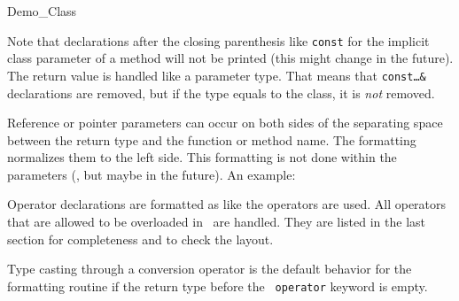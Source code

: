 \begin{class}{Demo_Class}
{Note that declarations after the closing parenthesis like {\tt const}
for the implicit class parameter of a method will not be printed
(this might change in the future).
The return value is handled like a parameter type. That means that
{\tt const\ldots\&} declarations are removed, but if the type equals
to the class, it is {\em not} removed.






Reference or pointer parameters can occur on both sides of the
separating space between the return type and the function or method
name. The formatting normalizes them to the left side. This
formatting is not done within the parameters (, but maybe in the
future). An example: 





Operator declarations are formatted as like the operators are
used.  All operators that are allowed to be overloaded in \CC\ are
handled. They are listed in the last section for completeness and
to check the layout. 

Type casting through a conversion operator is the default behavior 
for the formatting routine if the return type before the {\tt 
operator} keyword is empty.



}
\end{class}
